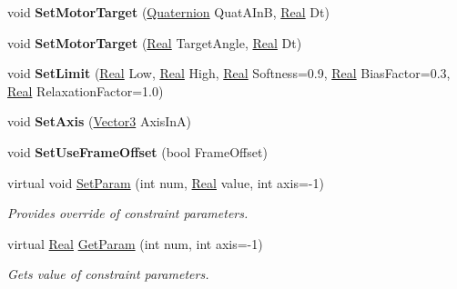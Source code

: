 \begin{DoxyCompactItemize}
\item 
\hypertarget{classphys_1_1HingeConstraint_a9a9b914a2a64f3cbc09700c61fcdce41}{
void {\bfseries SetMotorTarget} (\hyperlink{classphys_1_1Quaternion}{Quaternion} QuatAInB, \hyperlink{namespacephys_af7eb897198d265b8e868f45240230d5f}{Real} Dt)}
\label{d3/d0d/classphys_1_1HingeConstraint_a9a9b914a2a64f3cbc09700c61fcdce41}

\item 
\hypertarget{classphys_1_1HingeConstraint_a6080b88f14312a509fe089f7c893e62d}{
void {\bfseries SetMotorTarget} (\hyperlink{namespacephys_af7eb897198d265b8e868f45240230d5f}{Real} TargetAngle, \hyperlink{namespacephys_af7eb897198d265b8e868f45240230d5f}{Real} Dt)}
\label{d3/d0d/classphys_1_1HingeConstraint_a6080b88f14312a509fe089f7c893e62d}

\item 
\hypertarget{classphys_1_1HingeConstraint_acabfc495ddd1da39fc1709be32923d1b}{
void {\bfseries SetLimit} (\hyperlink{namespacephys_af7eb897198d265b8e868f45240230d5f}{Real} Low, \hyperlink{namespacephys_af7eb897198d265b8e868f45240230d5f}{Real} High, \hyperlink{namespacephys_af7eb897198d265b8e868f45240230d5f}{Real} Softness=0.9, \hyperlink{namespacephys_af7eb897198d265b8e868f45240230d5f}{Real} BiasFactor=0.3, \hyperlink{namespacephys_af7eb897198d265b8e868f45240230d5f}{Real} RelaxationFactor=1.0)}
\label{d3/d0d/classphys_1_1HingeConstraint_acabfc495ddd1da39fc1709be32923d1b}

\item 
\hypertarget{classphys_1_1HingeConstraint_a25b0004ae13f202cff82f7aaa3722d98}{
void {\bfseries SetAxis} (\hyperlink{classphys_1_1Vector3}{Vector3} AxisInA)}
\label{d3/d0d/classphys_1_1HingeConstraint_a25b0004ae13f202cff82f7aaa3722d98}

\item 
\hypertarget{classphys_1_1HingeConstraint_a06a8ac244cefe64c2ce865e608cb2f41}{
void {\bfseries SetUseFrameOffset} (bool FrameOffset)}
\label{d3/d0d/classphys_1_1HingeConstraint_a06a8ac244cefe64c2ce865e608cb2f41}

\item 
virtual void \hyperlink{classphys_1_1HingeConstraint_adec79d062d67532e3521eaae6b49f877}{SetParam} (int num, \hyperlink{namespacephys_af7eb897198d265b8e868f45240230d5f}{Real} value, int axis=-\/1)
\begin{DoxyCompactList}\small\item\em Provides override of constraint parameters. \item\end{DoxyCompactList}\item 
virtual \hyperlink{namespacephys_af7eb897198d265b8e868f45240230d5f}{Real} \hyperlink{classphys_1_1HingeConstraint_a7e8c001ee6291bf457c9860124cacaf8}{GetParam} (int num, int axis=-\/1)
\begin{DoxyCompactList}\small\item\em Gets value of constraint parameters. \item\end{DoxyCompactList}\end{DoxyCompactItemize}
